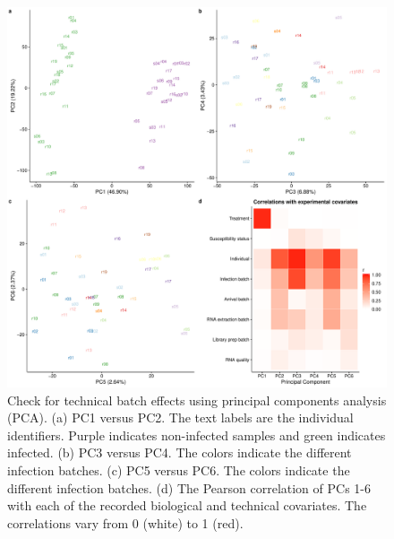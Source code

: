 \documentclass[fleqn,10pt]{wlscirep}
\begin{document}
\begin{figure}[ht]
\centering
\includegraphics[width=\linewidth]{../figure/batch-pca.pdf}
\caption{
Check for technical batch effects using principal components analysis
(PCA). (a) PC1 versus PC2. The text labels are the individual
identifiers. Purple indicates non-infected samples and green indicates
infected. (b) PC3 versus PC4. The colors indicate the different
infection batches. (c) PC5 versus PC6. The colors indicate the
different infection batches. (d) The Pearson correlation of PCs 1-6
with each of the recorded biological and technical covariates. The
correlations vary from 0 (white) to 1 (red).
}
\label{fig:batch}
\end{figure}
\end{document}
